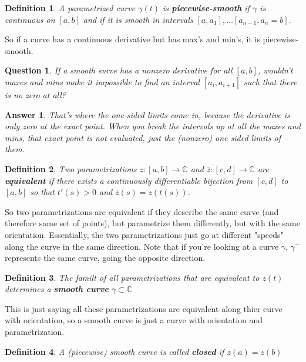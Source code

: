\documentclass[12pt]{article}
\newtheorem{definition}{Definition}
\newtheorem{question}{Question}
\newtheorem{answer}{Answer}
\begin{document}
\begin{definition}
  A parametrized curve $\gamma(t)$ is \textbf{piecewise-smooth} if $\gamma$ is continuous on $[a,b]$ and if it is smooth in intervals $[a, a_1], \dots [a_{n-1},a_n = b]$.
\end{definition}

So if a curve has a continuous derivative but has max's and min's, it is piecewise-smooth. 

\begin{question}
  If a smooth surve has a nonzero derivative for all $[a,b]$, wouldn't maxes and mins make it impossible to find an interval $[a_i,a_{i+1}]$ such that
  there is no zero at all?
\end{question}

\begin{answer}
  That's where the one-sided limits come in, because the derivative is only zero at the exact point. When you break the intervals up at all the maxes and mins, 
  that exact point is not evaluated, just the (nonzero) one sided limits of them.
\end{answer}

\begin{definition}
  Two parametrizations $z: [a,b] \to \mathbb{C}$ and $\bar{z}: [c,d] \to \mathbb{C}$ are \textbf{equivalent} if there exists a continuously differentiable bijection
  from $[c,d]$ to $[a,b]$ so that $t'(s) > 0$ and $\bar{z}(s)=z(t(s))$.
\end{definition}

So two parametrizations are equivalent if they describe the same curve (and therefore same set of points), but parametrize them differently, but with the same orientation. 
Essentially, the two parametrizations just go at different "speeds" along the curve in the same direction. Note that if you're looking at a curve $\gamma$, $\gamma^-$ 
represents the same curve, going the opposite direction. 

\begin{definition}
  The familt of all parametrizations that are equivalent to $z(t)$ determines a \textbf{smooth curve} $\gamma \subset \mathbb{C}$
\end{definition}

This is just saying all these parametrizations are equivalent along thier curve with orientation, so a smooth curve is just a curve with orientation and parametrization. 

\begin{definition}
  A (piecewise) smooth curve is called \textbf{closed} if $z(a)=z(b)$
\end{definition}
\end{document}
